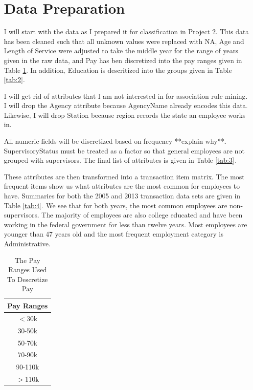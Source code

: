\documentclass{article}
\begin{document}
\section{Data Preparation}
I will start with the data as I prepared it for classification in Project 2. This data has been cleaned such that all unknown values were replaced with NA, Age and Length of Service were adjusted to take the middle year for the range of years given in the raw data, and Pay has ben discretized into the pay ranges given in Table \ref{tab:1}. In addition, Education is descritized into the groups given in Table \ref{tab:2}.
\par
I will get rid of attributes that I am not interested in for association rule mining. I will drop the Agency attribute because AgencyName already encodes this data. Likewise, I will drop Station because region records the state an employee works in.
\par
All numeric fields will be discretized based on frequency **explain why**. SupervisoryStatus must be treated as a factor so that general employees are not grouped with supervisors. The final list of attributes is given in Table \ref{tab:3}.
\par
These attributes are then transformed into a transaction item matrix. The most frequent items show us what attributes are the most common for employees to have. Summaries for both the 2005 and 2013 transaction data sets are given in Table \ref{tab:4}. We see that for both years, the most common employees are non-supervisors. The majority of employees are also college educated and have been working in the federal government for less than twelve years. Most employees are younger than 47 years old and the most frequent employment category is Administrative.

    \begin{center}
        \begin{table}
            \centering
            \begin{tabular}{ |c| }
                \hline
                Pay Ranges \\
                \hline
                $<$30k \\
                30-50k \\
                50-70k \\
                70-90k \\
                90-110k \\
                $>$110k \\
                \hline
            \end{tabular}
            \caption{The Pay Ranges Used To Descretize Pay}
            \label{tab:1}
        \end{table}
    \end{center}
\end{document}
